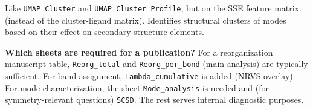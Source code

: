 \documentclass[11pt,a4paper,twoside]{article}
\theoremstyle{remark}
\begin{document}
Like \texttt{UMAP\_Cluster} and \texttt{UMAP\_Cluster\_Profile},
but on the SSE feature matrix (instead of the cluster-ligand
matrix). Identifies structural clusters of modes based on their
effect on secondary-structure elements.

\begin{infobox}
\textbf{Which sheets are required for a publication?}
For a reorganization manuscript table, \texttt{Reorg\_total} and
\texttt{Reorg\_per\_bond} (main analysis) are typically
sufficient. For band assignment, \texttt{Lambda\_cumulative} is
added (NRVS overlay). For mode characterization, the sheet
\texttt{Mode\_analysis} is needed and (for symmetry-relevant
questions) \texttt{SCSD}. The rest serves internal diagnostic
purposes.
\end{infobox}


\end{document}
